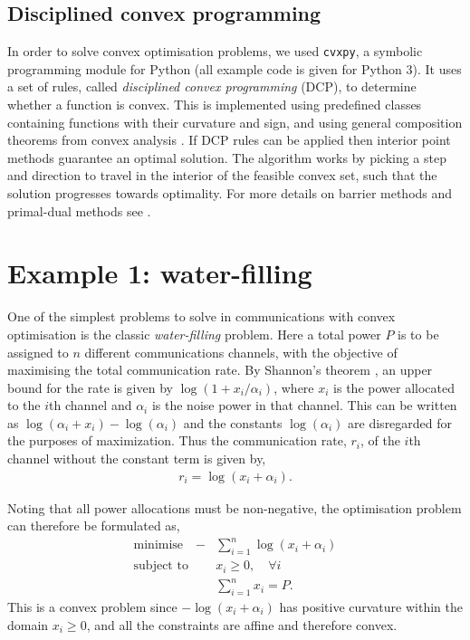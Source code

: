 \documentclass[twocolumn,secnumarabic,amssymb, nobibnotes, aps, prl,superscriptaddress]{revtex4-1}
\begin{document}
\subsection{Disciplined convex programming}
\noindent In order to solve convex optimisation problems, we used \texttt{cvxpy}, a symbolic programming module for Python \cite{cvxpy} (all example code is given for Python 3). It uses a set of rules, called \textit{disciplined convex programming} (DCP), to determine whether a function is convex. This is implemented using predefined classes containing functions with their curvature and sign, and using general composition theorems from convex analysis \cite{dcp}. If DCP rules can be applied then interior point methods guarantee an optimal solution. 
 The algorithm works by picking a step and direction to travel in the interior of the feasible convex set, such that the solution progresses towards optimality. For more details on barrier methods and primal-dual methods see \citep[p.561]{cvxpybook}.
 
\section{Example 1: water-filling}
 
\noindent{}One of the simplest problems to solve in communications with convex optimisation is the classic \textit{water-filling} problem.  Here a total power $P$ is to be assigned to $n$ different communications channels, with the objective of maximising the total communication rate.  By Shannon's theorem \citep[p.245]{cvxpybook}, an upper bound for the rate is given by $\log(1+x_i/\alpha_i)$, where $x_i$ is the power allocated to the $i$th channel and $\alpha_i$ is the noise power in that channel. This can be written as $\log(\alpha_i+x_i)-\log(\alpha_i)$ and the constants $\log(\alpha_i)$ are disregarded for the purposes of maximization. Thus the communication rate, $r_i$, of the $i$th channel without the constant term is given by,
 \begin{align}
  r_i = \log(x_i+\alpha_i).
 \end{align}

 
Noting that all power allocations must be non-negative, the optimisation problem can therefore be formulated as,
 \begin{align}
\text{minimise} \quad  -&\sum_{i=1}^{n} \log(x_i+\alpha_i) \nonumber \\
\text{subject to} \quad &x_i \geqslant 0, \quad \forall i \nonumber \\
&\sum_{i=1}^{n}x_i = P.
 \end{align}
This is a convex problem since $-\log(x_i+\alpha_i)$ has positive curvature within the domain $x_i \geqslant 0$, and all the constraints are affine and therefore convex.
\end{document}
